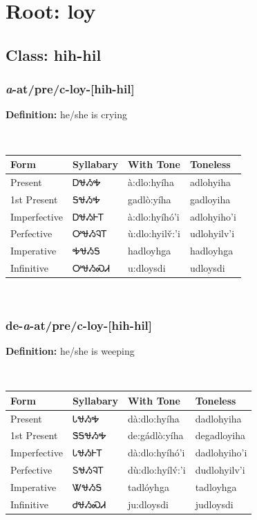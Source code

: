 \needspace{4in}
\section*{Root: loy}
\nopagebreak
{}
\needspace{3in}
\subsection*{Class: hih-hil}
\nopagebreak
\needspace{2in}
\subsubsection*{\textit{a}{-}at/pre/c{-}\textbf{loy}{-}[hih-hil]}
\nopagebreak
\textbf{Definition: } he/she is crying
\\[0.5em]
\begin{tabularx}{\textwidth}{l X X X}%
\toprule%
\textbf{Form}&\textbf{Syllabary}&\textbf{With Tone}&\textbf{Toneless}\\%
\midrule%
Present&ᎠᏠᏱᎭ&à:dlo:hyíha&adlohyiha\\%
1st Present&ᎦᏠᏱᎭ&gadlò:yíha&gadloyiha\\%
Imperfective&ᎠᏠᏱᎰᎢ&à:dlo:hyíhó’i&adlohyiho’i\\%
Perfective&ᎤᏠᏱᎸᎢ&ù:dlo:hyilv̌:’i&udlohyilv’i\\%
Imperative&ᎭᏠᏱᎦ&hadloyhga&hadloyhga\\%
Infinitive&ᎤᏠᏱᏍᏗ&u:dloysdi&udloysdi\\%
\bottomrule%
\end{tabularx}
\\[1em]
\needspace{2in}
\subsubsection*{de{-}\textit{a}{-}at/pre/c{-}\textbf{loy}{-}[hih-hil]}
\nopagebreak
\textbf{Definition: } he/she is weeping
\\[0.5em]
\begin{tabularx}{\textwidth}{l X X X}%
\toprule%
\textbf{Form}&\textbf{Syllabary}&\textbf{With Tone}&\textbf{Toneless}\\%
\midrule%
Present&ᏓᏠᏱᎭ&dà:dlo:hyíha&dadlohyiha\\%
1st Present&ᏕᎦᏠᏱᎭ&de:gádlò:yíha&degadloyiha\\%
Imperfective&ᏓᏠᏱᎰᎢ&dà:dlo:hyíhó’i&dadlohyiho’i\\%
Perfective&ᏚᏠᏱᎸᎢ&dù:dlo:hyílv́:’i&dudlohyilv’i\\%
Imperative&ᏔᏠᏱᎦ&tadlóyhga&tadloyhga\\%
Infinitive&ᏧᏠᏱᏍᏗ&ju:dloysdi&judloysdi\\%
\bottomrule%
\end{tabularx}
\\[1em]